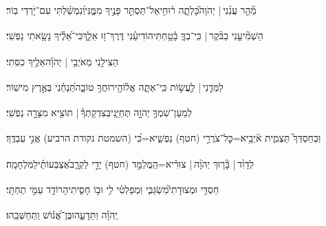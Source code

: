 \documentclass[12pt]{article}
\newcommand{\loc}[1]{\textsuperscript{\locf{#1}}}
\begin{document}
{\loc{ ז}~}‏מַ֘הֵ֤ר עֲנֵ֨נִי |  יְהֹוָה֮{\hfill}כָּלְתָ֢ה ר֫וּחִ֥י\newline\hspace*{.5em}אַל־תַּסְתֵּ֣ר פָּנֶ֣יךָ מִמֶּ֑נִּי{\hfill}וְ֝נִמְשַׁ֗לְתִּי עִם־יֹ֥רְדֵי בֽוֹר׃\par

{\loc{ ח}~}‏הַשְׁמִ֘יעֵ֤נִי בַבֹּ֨קֶר |  {\hfill}כִּֽי־בְךָ֢ בָ֫טָ֥חְתִּי\newline\hspace*{.5em}הוֹדִיעֵ֗נִי דֶּרֶךְ־ז֥וּ אֵלֵ֑ךְ{\hfill}כִּי־אֵ֝לֶ֗יךָ נָשָׂ֥אתִי נַפְשִֽׁי׃\par

{\loc{ ט}~}‏הַצִּילֵ֖נִי מֵאֹיְבַ֥י | יְהֹוָ֗ה{\hfill}אֵלֶ֥יךָ כִסִּֽתִי׃\par

{\loc{ י}~}‏לַמְּדֵ֤נִי |  לַ֥עֲשׂ֣וֹת {\hfill}כִּֽי־אַתָּ֢ה אֱל֫וֹהָ֥י\newline\hspace*{.5em}רוּחֲךָ֥ טוֹבָ֑ה{\hfill}תַּ֝נְחֵ֗נִי בְּאֶ֣רֶץ מִישֽׁוֹר׃\par

{\loc{ יא}~}‏לְמַעַן־שִׁמְךָ֣ יְהֹוָ֣ה תְּחַיֵּ֑נִי{\hfill}בְּצִדְקָתְךָ֓ |  תּוֹצִ֖יא מִצָּרָ֣ה נַפְשִֽׁי׃\par

{\loc{ יב}~}‏וּֽבְחַסְדְּךָ֮ תַּצְמִ֢ית אֹ֫יְבָ֥י{\hfill}\newline\hspace*{.5em}א=כׇּל־צֹרֲרֵ֣י (חטף) נַפְשִׁ֑י{\hfill}א=כִּ֝י (השמטת נקודת הרביע) אֲנִ֣י עַבְדֶּֽךָ׃\par\pend
\ledpb
\pstart[\subsection*{\textcolor{red}{פרק קמד}}]\label{פרק קמד}
{\loc{ א}~}‏לְדָוִ֨ד |  בָּ֘ר֤וּךְ יְהֹוָ֨ה |  צוּרִ֗י\newline\hspace*{.5em}א=הַֽמֲלַמֵּ֣ד (חטף) יָדַ֣י לַקְרָ֑ב{\hfill}אֶ֝צְבְּעוֹתַ֗י\hspace{1em}לַמִּלְחָמָֽה׃\par

{\loc{ ב}~}‏חַסְדִּ֥י וּמְצוּדָתִי֮{\hfill}מִשְׂגַּבִּ֢י וּֽמְפַלְטִ֫י לִ֥י\newline\hspace*{.5em} וּב֣וֹ חָסִ֑יתִי{\hfill}הָרוֹדֵ֖ד עַמִּ֣י תַחְתָּֽי׃\par

{\loc{ ג}~}‏יְֽהֹוָ֗ה  וַתֵּדָעֵ֑הוּ{\hfill}בֶּן־אֱ֝נ֗וֹשׁ וַֽתְּחַשְּׁבֵֽהוּ׃\par
\end{document}
